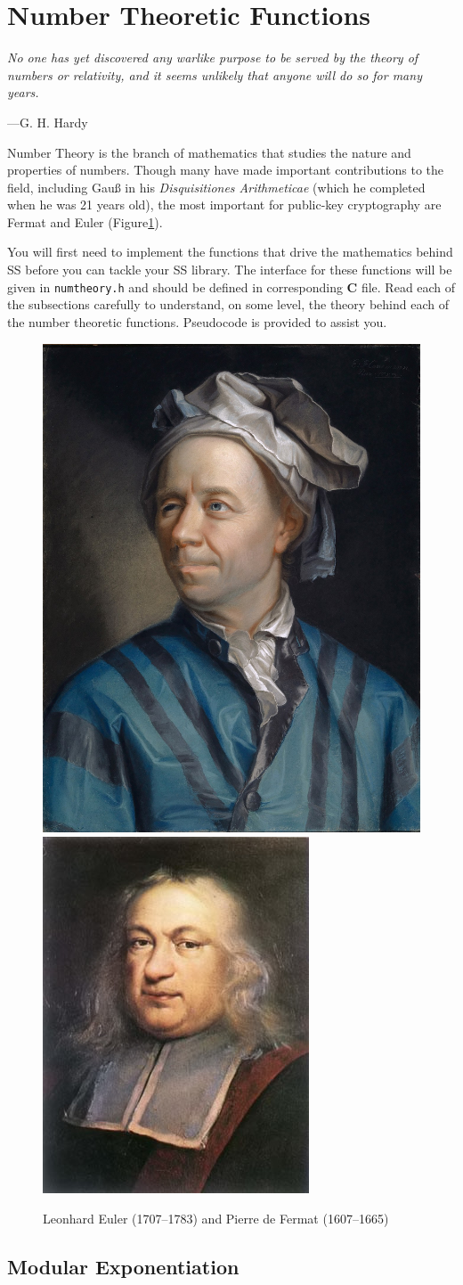 \section{Number Theoretic Functions}
\epigraph{\emph{No one has yet discovered any warlike purpose to be served by the theory of numbers or relativity, and it seems unlikely that anyone will do so for many years.}}
{---G.\xspace H.\xspace Hardy}

\noindent
Number Theory is the branch of mathematics that studies the nature
and properties of numbers. Though many have made important contributions
to the field, including Gau{\ss} in his \emph{Disquisitiones
Arithmeticae} (which he completed when he was 21 years old), the
most important for public-key cryptography are Fermat and Euler
(Figure\xspace\ref{fig:euler}).

You will first need to implement the functions that drive the
mathematics behind SS before you can tackle your SS library. The
interface for these functions will be given in \texttt{numtheory.h} and
should be defined in corresponding \textbf{C} file. Read each of the subsections
carefully to understand, on some level, the theory behind each of the
number theoretic functions. Pseudocode is provided to assist you.

\begin{figure}[tbhp]
        \centering
        \includegraphics[height=0.23\textwidth]{./images/euler.jpg}\quad
        \includegraphics[height=0.23\textwidth]{./images/fermat.jpg}
        \caption{Leonhard Euler (1707--1783) and Pierre de Fermat (1607--1665)}\label{fig:euler}
\end{figure}
\subsection{Modular Exponentiation}

